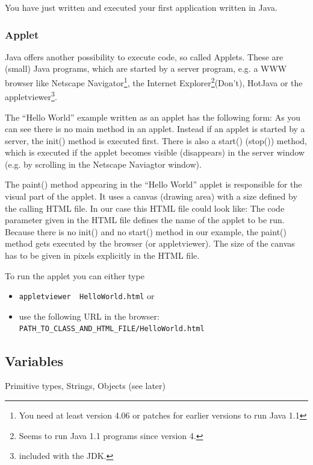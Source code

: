You have just written and executed your first application written in Java.


\subsubsection{Applet}

Java offers another possibility to execute code, so called Applets.
These are (small) Java programs, which are started by a server program,
e.g. a WWW browser like Netscape Navigator\footnote{You need at least 
version 4.06 or patches for earlier versions to run Java 1.1}, 
the Internet Explorer\footnote{Seems to run Java 1.1 programs since
version 4.}(Don't),
HotJava or the appletviewer\footnote{included with the JDK.}.

The ``Hello World'' example written as an applet has the following form:
As you can see there is no main method in an applet. Instead if an applet
is started by a server, the init() method is executed first. There is also
a start() (stop()) method, which is executed if the applet becomes
visible (disappears) in the server window (e.g. by scrolling in the
Netscape Naviagtor window).

The paint() method appearing in the ``Hello World'' applet is
responsible for the visual part of the applet. It uses a canvas
(drawing area) with a size defined by the calling HTML file. In our case
this HTML file could look like:
The code parameter given in the HTML file defines the name of the applet
to be run. Because there is no init() and no start() method in our
example, the paint() method gets executed by the browser (or appletviewer).
The size of the canvas has to be given in pixels explicitly in the
HTML file.

To run the applet you can either type
\begin{itemize}
\item \verb|appletviewer  HelloWorld.html| or
\item use the following URL in the browser: \\
        \verb|PATH_TO_CLASS_AND_HTML_FILE/HelloWorld.html|
\end{itemize}


\subsection{Variables}
\label{sec:Variables}
Primitive types, Strings, Objects (see later)

